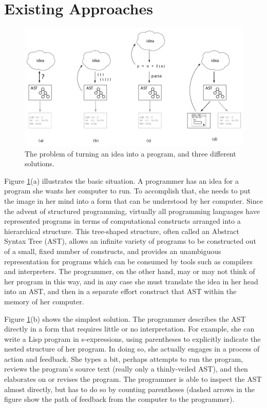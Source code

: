 \section{Existing Approaches}

\begin{figure}[h]
  \centering
  
  \includegraphics{src/image/figure1.pdf}

  \caption{The problem of turning an idea into a program, and three different solutions.}
  \label{fig-1}
\end{figure}

Figure \ref{fig-1}(a) illustrates the basic situation. A programmer has an idea for a program she wants her computer to run. To accomplish that, she needs to put the image in her mind into a form that can be understood by her computer. Since the advent of structured programming, virtually all programming languages have represented programs in terms of computational constructs arranged into a hierarchical structure. This tree-shaped structure, often called an Abstract Syntax Tree (AST), allows an infinite variety of programs to be constructed out of a small, fixed number of constructs, and provides an unambiguous representation for programs which can be consumed by tools such as compilers and interpreters. The programmer, on the other hand, may or may not think of her program in this way, and in any case she must translate the idea in her head into an AST, and then in a separate effort construct that AST within the memory of her computer.

Figure \ref{fig-1}(b) shows the simplest solution. The programmer describes the AST directly in a form that requires little or no interpretation. For example, she can write a Lisp program in s-expressions, using parentheses to explicitly indicate the nested structure of her program. In doing so, she actually engages in a process of action and feedback. She types a bit, perhaps attempts to run the program, reviews the program's source text (really only a thinly-veiled AST), and then elaborates on or revises the program. The programmer is able to inspect the AST almost directly, but has to do so by counting parentheses (dashed arrows in the figure show the path of feedback from the computer to the programmer).

